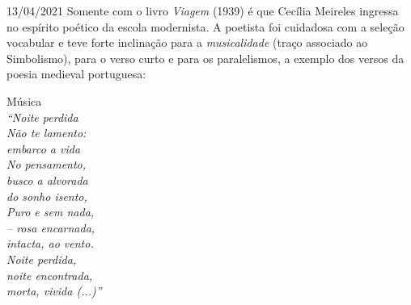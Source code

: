\documentclass{SchoolBook}
\begin{document}
    \begin{day}{13/04/2021}
        Somente com o livro \emph{Viagem} (1939) é que Cecília Meireles ingressa no espírito poético da escola modernista. A poetista foi cuidadosa com a seleção vocabular e teve forte inclinação para a \emph{musicalidade} (traço associado ao Simbolismo), para o verso curto e para os paralelismos, a exemplo dos versos da poesia medieval portuguesa:
    
        \begin{center}
            Música \\
            \it\vspace{6pt}
            “Noite perdida  \\
            Não te lamento: \\
            embarco a vida  \\
            \vspace{6pt}
            No pensamento,   \\
            busco a alvorada \\
            do sonho isento, \\
            \vspace{6pt}
            Puro e sem nada,   \\
            -- rosa encarnada, \\
            intacta, ao vento. \\
            \vspace{6pt}
            Noite perdida,    \\
            noite encontrada, \\
            morta, vivida (...)”
        \end{center}
    \end{day}
\end{document}
